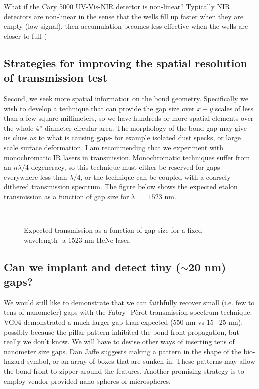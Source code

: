 What if the Cary 5000 UV-Vis-NIR detector is non-linear?  Typically NIR detectors are non-linear in the sense that the wells fill up faster when they are empty (low signal), then accumulation becomes less effective when the wells are closer to full ( 

\subsection{Strategies for improving the spatial resolution of transmission test}
Second, we seek more spatial information on the bond geometry.  Specifically we wish to develop a technique that can provide the gap size over $x-y$ scales of less than a few square millimeters, so we have hundreds or more spatial elements over the whole 4'' diameter circular area.  The morphology of the bond gap may give us clues as to what is causing gaps- for example isolated dust specks, or large scale surface deformation.  I am recommending that we experiment with monochromatic IR lasers in transmission.  Monochromatic techniques suffer from an $n\lambda/4$ degeneracy, so this technique must either be reserved for gaps everywhere less than $\lambda/4$, or the technique can be coupled with a coarsely dithered transmission spectrum.  The figure below shows the expected etalon transmission as a function of gap size for $\lambda \;= \;1523$ nm. 

\begin{figure}[h!] 
\begin{center}
\ 
\caption[Monochromatic Fabry-P\`{e}rot at 1523 nm]{Expected transmission as a function of gap size for a fixed wavelength- a 1523 nm HeNe laser.}
\label{fig:1523nmFP}
\end{center}
\end{figure}

\subsection{Can we implant and detect tiny ($\sim$20 nm) gaps?}
We would still like to demonstrate that we can faithfully recover small (i.e. few to tens of nanometer) gaps with the Fabry$-$P\`erot transmission spectrum technique. VG04 demonstrated a much larger gap than expected (550 nm vs 15$-$25 nm), possibly because the pillar-pattern inhibited the bond front propagation, but really we don't know.  We will have to devise other ways of inserting tens of nanometer size gaps.  Dan Jaffe suggests making a pattern in the shape of the bio-hazard symbol, or an array of boxes that are sunken-in.  These patterns may allow the bond front to zipper around the features.  Another promising strategy is to employ vendor-provided nano-spheres or microspheres.  

